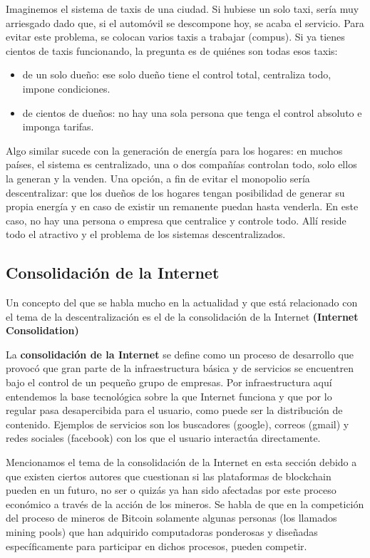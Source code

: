 \documentclass[12pt]{report} %
\begin{document}
Imaginemos el sistema de taxis de una ciudad. Si hubiese un solo taxi, sería muy arriesgado dado que, si el automóvil se descompone hoy, se acaba el servicio. Para evitar este problema, se colocan varios taxis a trabajar (compus). Si ya tienes cientos de taxis funcionando, la pregunta es de quiénes son todas esos taxis:

\begin{itemize}
    \item de un solo dueño: ese solo dueño tiene el control total, centraliza todo, impone condiciones.
    \item de cientos de dueños: no hay una sola persona que tenga el control absoluto e imponga tarifas.
\end{itemize}

Algo similar sucede con la generación de energía para los hogares: en muchos países, el sistema es centralizado, una o dos compañías controlan todo, solo ellos la generan y la venden. Una opción, a fin de evitar el monopolio sería descentralizar: que los dueños de los hogares tengan posibilidad de generar su propia energía y en caso de existir un remanente puedan hasta venderla. En este caso, no hay una persona o empresa que centralice y controle todo. Allí reside todo el atractivo y el problema de los sistemas descentralizados.

\subsection{Consolidación de la Internet}

Un concepto del que se habla mucho en la actualidad y que está relacionado con el tema de la descentralización es el de la consolidación de la Internet \textbf{(Internet Consolidation)}

La \textbf{consolidación de la Internet} se define como un proceso de desarrollo que provocó que gran parte de la infraestructura básica y de servicios se encuentren bajo el control de un pequeño grupo de empresas. Por infraestructura aquí entendemos la base tecnológica sobre la que Internet funciona y que por lo regular pasa desapercibida para el usuario, como puede ser la distribución de contenido. Ejemplos de servicios son los buscadores (google), correos (gmail) y redes sociales (facebook) con los que el usuario interactúa directamente.

Mencionamos el tema de la consolidación de la Internet en esta sección debido a que existen ciertos autores que cuestionan si las plataformas de blockchain pueden en un futuro, no ser o quizás ya han sido afectadas por este proceso económico a través de la acción de los mineros.  Se habla de que en la competición del proceso de mineros de Bitcoin solamente algunas personas (los llamados mining pools) que han adquirido computadoras ponderosas y diseñadas específicamente para participar en dichos procesos, pueden competir.     
\end{document}
